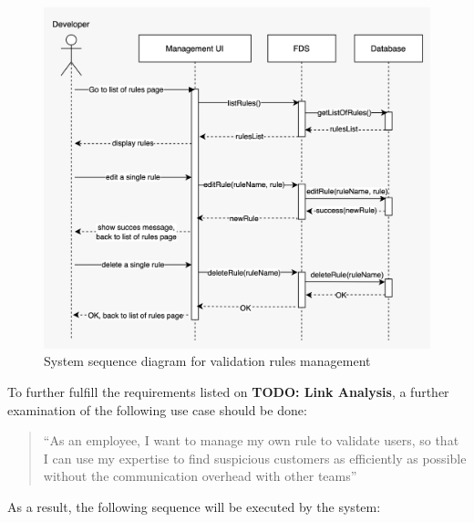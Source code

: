 \begin{figure}[!ht]
 \includegraphics[width=\textwidth]{diagrams/sequence_management.jpeg}
 \caption{System sequence diagram for validation rules management}
\end{figure}


To further fulfill the requirements listed on \textbf{TODO: Link Analysis}, a further examination of the following use case should be done:

\begin{quotation}
 \enquote{As an employee, I want to manage my own rule to validate users, so that I can use my expertise to find suspicious customers as efficiently as possible without the communication overhead with other teams} 
\end{quotation}

As a result, the following sequence will be executed by the system:

